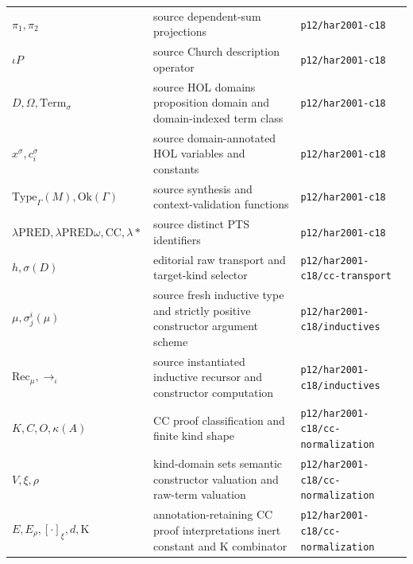\begin{longtable}{@{}p{}p{}p{}@{}}
\(\pi_1,\allowbreak \pi_2\) & source dependent-sum projections & \texttt{p12/\allowbreak{}har2001-\allowbreak{}c18} \\
\(\iota P\) & source Church description operator & \texttt{p12/\allowbreak{}har2001-\allowbreak{}c18} \\
\(D,\allowbreak \Omega,\allowbreak \mathrm{Term}_\sigma\) & source HOL domains proposition domain and domain-indexed term class & \texttt{p12/\allowbreak{}har2001-\allowbreak{}c18} \\
\(x^\sigma,\allowbreak c_i^\sigma\) & source domain-annotated HOL variables and constants & \texttt{p12/\allowbreak{}har2001-\allowbreak{}c18} \\
\(\mathrm{Type}_\Gamma(M),\allowbreak \mathrm{Ok}(\Gamma)\) & source synthesis and context-validation functions & \texttt{p12/\allowbreak{}har2001-\allowbreak{}c18} \\
\(\lambda\mathrm{PRED},\allowbreak \lambda\mathrm{PRED}\omega,\allowbreak \mathrm{CC},\allowbreak \lambda\ast\) & source distinct PTS identifiers & \texttt{p12/\allowbreak{}har2001-\allowbreak{}c18} \\
\(h,\allowbreak \sigma(D)\) & editorial raw transport and target-kind selector & \texttt{p12/\allowbreak{}har2001-\allowbreak{}c18/\allowbreak{}cc-\allowbreak{}transport} \\
\(\mu,\allowbreak \sigma_j^i(\mu)\) & source fresh inductive type and strictly positive constructor argument scheme & \texttt{p12/\allowbreak{}har2001-\allowbreak{}c18/\allowbreak{}inductives} \\
\(\mathrm{Rec}_\mu,\allowbreak \to_\iota\) & source instantiated inductive recursor and constructor computation & \texttt{p12/\allowbreak{}har2001-\allowbreak{}c18/\allowbreak{}inductives} \\
\(K,\allowbreak C,\allowbreak O,\allowbreak \kappa(A)\) & CC proof classification and finite kind shape & \texttt{p12/\allowbreak{}har2001-\allowbreak{}c18/\allowbreak{}cc-\allowbreak{}normalization} \\
\(V,\allowbreak \xi,\allowbreak \rho\) & kind-domain sets semantic constructor valuation and raw-term valuation & \texttt{p12/\allowbreak{}har2001-\allowbreak{}c18/\allowbreak{}cc-\allowbreak{}normalization} \\
\(E,\allowbreak E_\rho,\allowbreak [\cdot]_\xi,\allowbreak d,\allowbreak \mathrm K\) & annotation-retaining CC proof interpretations inert constant and K combinator & \texttt{p12/\allowbreak{}har2001-\allowbreak{}c18/\allowbreak{}cc-\allowbreak{}normalization} \\

\end{longtable}
